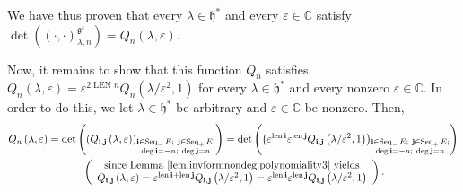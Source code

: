 \documentclass
[numbers=enddot,12pt,final,onecolumn,german,notitlepage]{scrartcl}%
\theoremstyle{definition}
\begin{document}
We have thus proven that every $\lambda\in\mathfrak{h}^{\ast}$ and every
$\varepsilon\in\mathbb{C}$ satisfy $\det\left(  \left(  \cdot,\cdot\right)
_{\lambda,n}^{\mathfrak{g}^{\varepsilon}}\right)  =Q_{n}\left(  \lambda
,\varepsilon\right)  $.

Now, it remains to show that this function $Q_{n}$ satisfies $Q_{n}\left(
\lambda,\varepsilon\right)  =\varepsilon^{2\operatorname*{LEN}n}Q_{n}\left(
\lambda/\varepsilon^{2},1\right)  $ for every $\lambda\in\mathfrak{h}^{\ast}$
and every nonzero $\varepsilon\in\mathbb{C}$. In order to do this, we let
$\lambda\in\mathfrak{h}^{\ast}$ be arbitrary and $\varepsilon\in\mathbb{C}$ be
nonzero. Then,
\begin{align}
Q_{n}\left(  \lambda,\varepsilon\right)   &  =\det\left(  \left(
Q_{\mathbf{i},\mathbf{j}}\left(  \lambda,\varepsilon\right)  \right)
_{\substack{\mathbf{i}\in\operatorname*{Seq}\nolimits_{-}E;\ \mathbf{j}%
\in\operatorname*{Seq}\nolimits_{+}E;\\\deg\mathbf{i}=-n;\ \deg\mathbf{j}%
=n}}\right)  =\det\left(  \left(  \varepsilon^{\operatorname*{len}\mathbf{i}%
}\varepsilon^{\operatorname*{len}\mathbf{j}}Q_{\mathbf{i},\mathbf{j}}\left(
\lambda/\varepsilon^{2},1\right)  \right)  _{\substack{\mathbf{i}%
\in\operatorname*{Seq}\nolimits_{-}E;\ \mathbf{j}\in\operatorname*{Seq}%
\nolimits_{+}E;\\\deg\mathbf{i}=-n;\ \deg\mathbf{j}=n}}\right)
\label{pf.invformnondeg.polynomiality5.1}\\
&  \ \ \ \ \ \ \ \ \ \ \left(
\begin{array}
[c]{c}%
\text{since Lemma \ref{lem.invformnondeg.polynomiality3} yields}\\
Q_{\mathbf{i},\mathbf{j}}\left(  \lambda,\varepsilon\right)  =\varepsilon
^{\operatorname*{len}\mathbf{i}+\operatorname*{len}\mathbf{j}}Q_{\mathbf{i}%
,\mathbf{j}}\left(  \lambda/\varepsilon^{2},1\right)  =\varepsilon
^{\operatorname*{len}\mathbf{i}}\varepsilon^{\operatorname*{len}\mathbf{j}%
}Q_{\mathbf{i},\mathbf{j}}\left(  \lambda/\varepsilon^{2},1\right)
\end{array}
\right)  .\nonumber
\end{align}
\end{document}
